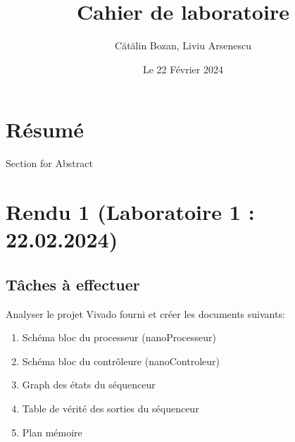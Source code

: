 \documentclass{article}
\title{Cahier de laboratoire}
\date{Le 22 Février 2024}
\author{Cătălin Bozan, Liviu Arsenescu}
\begin{document}
    \maketitle
    \newpage

    \section*{Résumé}
    Section for Abstract
    \newpage

    \tableofcontents
    \newpage

    \section{Rendu 1 (Laboratoire 1 : 22.02.2024)}
    \subsection{Tâches à effectuer}
    Analyser le projet Vivado fourni et créer les documents suivants:
    \begin{enumerate}
        \item Schéma bloc du processeur (nanoProcesseur)
        \item Schéma bloc du contrôleure (nanoControleur)
        \item Graph des états du séquenceur
        \item Table de vérité des sorties du séquenceur
        \item Plan mémoire
    \end{enumerate}
\end{document}
